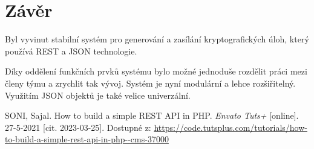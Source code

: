 \documentclass[titlepage]{article}
\begin{document}
\section*{Závěr}
Byl vyvinut stabilní systém pro generování a zasílání kryptografických úloh, který používá REST a JSON technologie. 

Díky oddělení funkčních prvků systému bylo možné jednoduše rozdělit práci mezi členy týmu a zrychlit tak vývoj. Systém je nyní modulární a lehce roz\-šiřitelný. Využitím JSON objektů je také velice univerzální. 



\begin{thebibliography}{9}
    SONI, Sajal. How to build a simple REST API in PHP. \emph{En\-va\-to Tuts+} [on\-li\-ne]. 27-5-2021 [cit. 2023-03-25]. Dostupné z: \url{https://code.tutsplus.com/tutorials/how-to-build-a-simple-rest-api-in-php--cms-37000}
\end{thebibliography}

    
\end{document}
